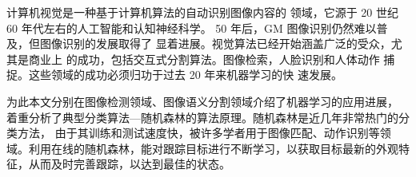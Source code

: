 \documentclass[UTF8,a4paper,10pt,nocolorlinks]{ctexart}
\begin{document}
    \begin{multicols}{2}
    计算机视觉是一种基于计算机算法的自动识别图像内容的
领域，它源于 20 世纪 60 年代左右的人工智能和认知神经科学。
50 年后，GM 图像识别仍然难以普及，但图像识别的发展取得了
显着进展。视觉算法已经开始涵盖广泛的受众，尤其是商业上
的成功，包括交互式分割算法。图像检索，人脸识别和人体动作
捕捉。这些领域的成功必须归功于过去 20 年来机器学习的快
速发展。\par 为此本文分别在图像检测领域、图像语义分割领域介绍了机器学习的应用进展，
着重分析了典型分类算法—随机森林的算法原理。随机森林是近几年非常热门的分类方法，
由于其训练和测试速度快，被许多学者用于图像匹配、动作识别等领域。利用在线的随机森林，能对跟踪目标进行不断学习，以获取目标最新的外观特征，从而及时完善跟踪，以达到最佳的状态。


\end{multicols}
\end{document}
